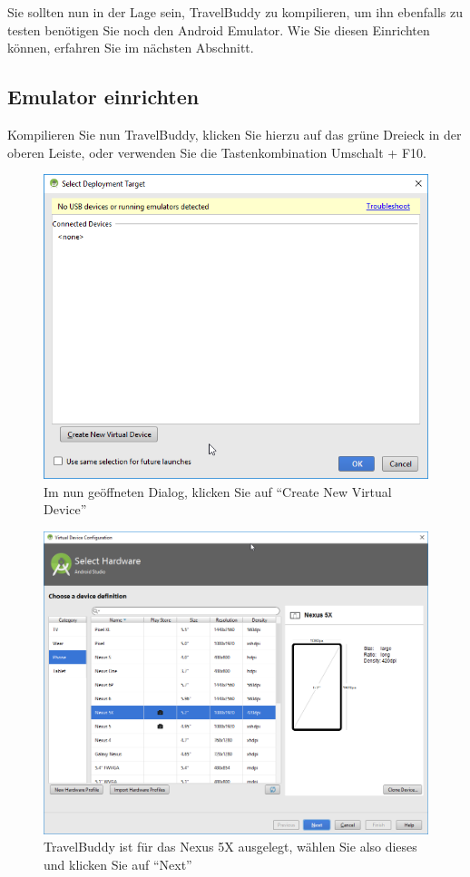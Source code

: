 \documentclass[a4paper,10pt,xetex]{article}
\begin{document}
Sie sollten nun in der Lage sein, TravelBuddy zu kompilieren, um ihn ebenfalls zu testen benötigen Sie noch den Android Emulator. Wie Sie diesen Einrichten können, erfahren Sie im nächsten Abschnitt.

\subsection{Emulator einrichten}

Kompilieren Sie nun TravelBuddy, klicken Sie hierzu auf das grüne Dreieck in der oberen Leiste, oder verwenden Sie die Tastenkombination Umschalt + F10.

\begin{figure}
  \centering
  \includegraphics[width=\textwidth]{Installation/3-0}
  \caption{Im nun geöffneten Dialog, klicken Sie auf ``Create New Virtual Device''}
\end{figure}

\begin{figure}
  \centering
  \includegraphics[width=\textwidth]{Installation/3-1}
  \caption{TravelBuddy ist für das Nexus 5X ausgelegt, wählen Sie also dieses und klicken Sie auf ``Next''}
\end{figure}
\end{document}
